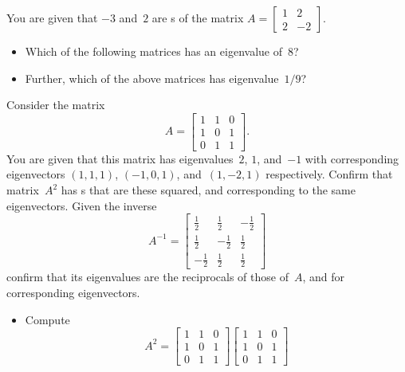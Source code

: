 \begin{activity}
You are given that \(-3\) and~\(2\) are s of the matrix \(A=\begin{bmatrix} 1&2\\2&-2 \end{bmatrix}\).
\begin{itemize}
\item Which of the following matrices has an eigenvalue of~\(8\)?
\item Further, which of the above matrices has eigenvalue~\(1/9\)?
\end{itemize}
\end{activity}






\begin{example} \label{eg:3x3sympow}
Consider the matrix 
\begin{equation*}
A=\begin{bmatrix} 1&1&0\\1&0&1\\0&1&1 \end{bmatrix}.
\end{equation*}
You are given that this matrix has eigenvalues~\(2\), \(1\), and~\(-1\) with corresponding eigenvectors \((1,1,1)\), \((-1,0,1)\), and~\((1,-2,1)\) respectively.
Confirm that matrix~\(A^2\) has s that are these squared, and corresponding to the same eigenvectors.
Given the inverse
\begin{equation*}
A^{-1}=\begin{bmatrix} \tfrac12&\tfrac12&-\tfrac12
\\\tfrac12&-\tfrac12&\tfrac12
\\-\tfrac12&\tfrac12&\tfrac12 \end{bmatrix}
\end{equation*}
confirm that its eigenvalues are the reciprocals of those of~\(A\), and for corresponding eigenvectors.
\begin{solution} 
\begin{itemize}
\item Compute
\begin{equation*}
A^2=\begin{bmatrix} 1&1&0\\1&0&1\\0&1&1 \end{bmatrix}
\begin{bmatrix} 1&1&0\\1&0&1\\0&1&1 \end{bmatrix}

\end{equation*}
\end{itemize}
\end{solution}
\end{example}
